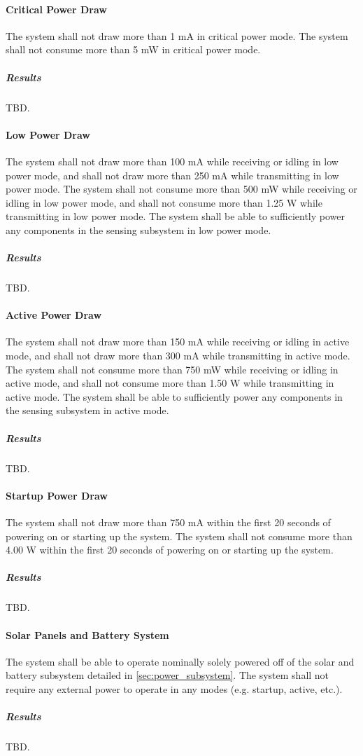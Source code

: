 \paragraph{Critical Power Draw} The system shall not draw more than 1 mA in
critical power mode. The system shall not consume more than 5 mW in critical
power mode.
\subparagraph{Results} TBD.

\paragraph{Low Power Draw} The system shall not draw more than 100 mA while
receiving or idling in low power mode, and shall not draw more than 250
mA while transmitting in low power mode. The system shall not consume more
than 500 mW while receiving or idling in low power mode, and shall not
consume more than 1.25 W while transmitting in low power mode. The system
shall be able to sufficiently power any components in the sensing subsystem in
low power mode.
\subparagraph{Results} TBD.

\paragraph{Active Power Draw} The system shall not draw more than 150 mA while
receiving or idling in active mode, and shall not draw more than 300
mA while transmitting in active mode. The system shall not consume more
than 750 mW while receiving or idling in active mode, and shall not
consume more than 1.50 W while transmitting in active mode. The system
shall be able to sufficiently power any components in the sensing subsystem in
active mode.
\subparagraph{Results} TBD.

\paragraph{Startup Power Draw} The system shall not draw more than 750 mA
within the first 20 seconds of powering on or starting up the system. The
system shall not consume more than 4.00 W within the first 20 seconds of
powering on or starting up the system.
\subparagraph{Results} TBD.

\paragraph{Solar Panels and Battery System} The system shall be able to
operate nominally solely powered off of the solar and battery subsystem
detailed in \autoref{sec:power_subsystem}. The system shall not require any
external power to operate in any modes (e.g. startup, active, etc.).
\subparagraph{Results} TBD.

